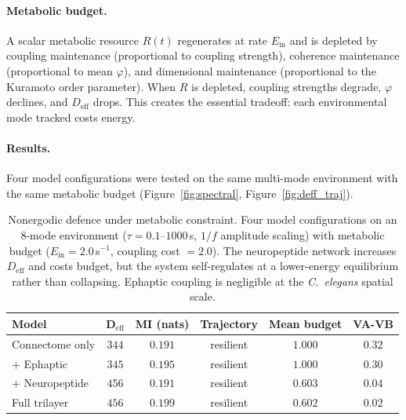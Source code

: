 \documentclass[12pt]{article}
\newcommand{\Deff}{D_{\mathrm{eff}}}
\begin{document}
\paragraph{Metabolic budget.} A scalar metabolic resource $R(t)$ regenerates at rate $E_{\mathrm{in}}$ and is depleted by coupling maintenance (proportional to coupling strength), coherence maintenance (proportional to mean $\varphi$), and dimensional maintenance (proportional to the Kuramoto order parameter). When $R$ is depleted, coupling strengths degrade, $\varphi$ declines, and $\Deff$ drops. This creates the essential tradeoff: each environmental mode tracked costs energy.

\paragraph{Results.} Four model configurations were tested on the same multi-mode environment with the same metabolic budget (Figure~\ref{fig:spectral}, Figure~\ref{fig:deff_traj}).


\begin{table}[H]
\centering
\caption{Nonergodic defence under metabolic constraint. Four model configurations on an 8-mode environment ($\tau = 0.1$--$1000$\,s, $1/f$ amplitude scaling) with metabolic budget ($E_{\mathrm{in}} = 2.0$\,s$^{-1}$, coupling cost $= 2.0$). The neuropeptide network increases $\Deff$ and costs budget, but the system self-regulates at a lower-energy equilibrium rather than collapsing. Ephaptic coupling is negligible at the \textit{C.~elegans} spatial scale.}
\label{tab:nonergodic}
\begin{tabular}{l c c c c c}
\toprule
\textbf{Model} & $\boldsymbol{\Deff}$ & \textbf{MI (nats)} & \textbf{Trajectory} & \textbf{Mean budget} & \textbf{VA-VB} \\
\midrule
Connectome only & $344$ & $0.191$ & resilient & $1.000$ & $0.32$ \\
+ Ephaptic & $345$ & $0.195$ & resilient & $1.000$ & $0.30$ \\
+ Neuropeptide & $456$ & $0.191$ & resilient & $0.603$ & $0.04$ \\
Full trilayer & $456$ & $0.199$ & resilient & $0.602$ & $0.02$ \\
\bottomrule
\end{tabular}
\end{table}
\end{document}
